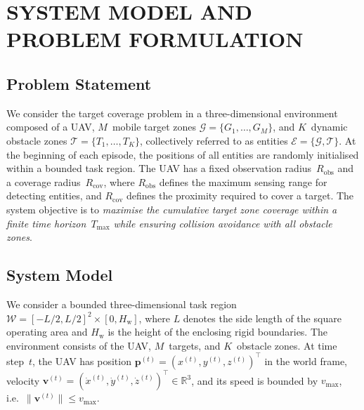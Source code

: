 
\section{SYSTEM MODEL AND PROBLEM FORMULATION}
\label{sec:system_model}

\subsection{Problem Statement}
\label{subsec:problem_statement}

We consider the target coverage problem in a three-dimensional environment
composed of a UAV, $M$~mobile target zones
$\mathcal{G} = \{G_1, \dots, G_M\}$, and $K$~dynamic obstacle zones
$\mathcal{T} = \{T_1, \dots, T_K\}$, collectively referred to as entities
$\mathcal{E} = \{\mathcal{G}, \mathcal{T}\}$.
At the beginning of each episode, the positions of all entities are randomly
initialised within a bounded task region.
The UAV has a fixed observation radius~$R_{\mathrm{obs}}$ and a coverage
radius~$R_{\mathrm{cov}}$, where $R_{\mathrm{obs}}$ defines the maximum
sensing range for detecting entities, and $R_{\mathrm{cov}}$ defines the
proximity required to cover a target.
The system objective is to \emph{maximise the cumulative target zone coverage within
a finite time horizon~$T_{\max}$ while ensuring collision avoidance with all
obstacle zones}.

\subsection{System Model}
\label{subsec:system_model}

We consider a bounded three-dimensional task region
$\mathcal{W} = [-L/2, L/2]^{2} \times [0, H_{\mathrm{w}}]$, where $L$
denotes the side length of the square operating area and $H_{\mathrm{w}}$ is
the height of the enclosing rigid boundaries.
The environment consists of the UAV, $M$~targets, and $K$~obstacle zones.
At time step~$t$, the UAV has position
$\mathbf{p}^{(t)} = (x^{(t)}, y^{(t)}, z^{(t)})^{\top}$ in the world frame,
velocity $\mathbf{v}^{(t)} = (\dot{x}^{(t)}, \dot{y}^{(t)},
\dot{z}^{(t)})^{\top} \in \mathbb{R}^3$, and its speed is bounded by
$v_{\max}$, i.e.\ $\lVert\mathbf{v}^{(t)}\rVert \le v_{\max}$.

